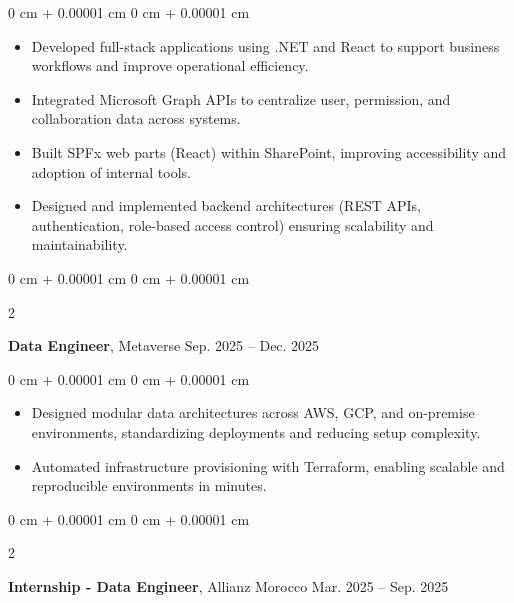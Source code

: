 \documentclass[10pt, letterpaper]{article}
\newenvironment{highlights}{
    \begin{itemize}[
        topsep=0.10 cm,
        parsep=0.10 cm,
        partopsep=0pt,
        itemsep=0pt,
        leftmargin=0 cm + 10pt
    ]
}{
    \end{itemize}
} %
\newenvironment{onecolentry}{
    \begin{adjustwidth}{
        0 cm + 0.00001 cm
    }{
        0 cm + 0.00001 cm
    }
}{
    \end{adjustwidth}
} %
\newenvironment{twocolentry}[2][]{
    \onecolentry
    \def\secondColumn{#2}
    \setcolumnwidth{\fill, 4.5 cm}
    \begin{paracol}{2}
}{
    \switchcolumn \raggedleft \secondColumn
    \end{paracol}
    \endonecolentry
} %
\begin{document}
        \vspace{0.10 cm}
        \begin{onecolentry}
            \begin{highlights}
    \item Developed full-stack applications using .NET and React to support business workflows and improve operational efficiency.
    \item Integrated Microsoft Graph APIs to centralize user, permission, and collaboration data across systems.
    \item Built SPFx web parts (React) within SharePoint, improving accessibility and adoption of internal tools.
    \item Designed and implemented backend architectures (REST APIs, authentication, role-based access control) ensuring scalability and maintainability.



            \end{highlights}
        \end{onecolentry}


        \vspace{0.2 cm}


    \begin{twocolentry}{
            Sep. 2025 –  Dec. 2025
        }
            \textbf{Data Engineer}, Metaverse \end{twocolentry}

        \vspace{0.10 cm}
        \begin{onecolentry}
            \begin{highlights}
                \item Designed modular data architectures across AWS, GCP, and on-premise environments, standardizing deployments and reducing setup complexity.
                \item Automated infrastructure provisioning with Terraform, enabling scalable and reproducible environments in minutes.


            \end{highlights}
        \end{onecolentry}


        \vspace{0.2 cm}
        
        \begin{twocolentry}{
            Mar. 2025 – Sep. 2025
        }
            \textbf{Internship - Data Engineer}, Allianz Morocco \end{twocolentry}
\end{document}
